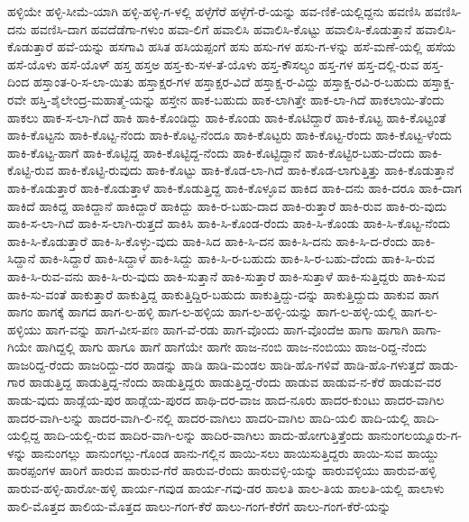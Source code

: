 ಹಳ್ಳಿಯೇ
ಹಳ್ಳಿ-ಸೀಮೆ-ಯಾಗಿ
ಹಳ್ಳಿ-ಹಳ್ಳಿ-ಗ-ಳಲ್ಲಿ
ಹಳ್ಳೆಗೆರೆ
ಹಳ್ಳೆಗೆ-ರೆ-ಯನ್ನು
ಹವ-ಣಿಕೆ-ಯಲ್ಲಿದ್ದನು
ಹವಣಿಸಿ
ಹವಣಿಸಿ-ದನು
ಹವಣಿಸಿ-ದಾಗ
ಹವದೆಡೆಗಾ-ಗಳುಂ
ಹವಾ-ಲಿಗೆ
ಹವಾಲಿಸಿ
ಹವಾಲಿಸಿ-ಕೊಟ್ಟು
ಹವಾಲಿಸಿ-ಕೊಡುತ್ತಾನೆ
ಹವಾಲಿಸಿ-ಕೊಡುತ್ತಾರೆ
ಹವೆ-ಯನ್ನು
ಹಸಗಾವಿ
ಹಸಿತ
ಹಸಿಯಪ್ಪಂಗೆ
ಹಸು
ಹಸು-ಗಳ
ಹಸು-ಗ-ಳನ್ನು
ಹಸೆ-ಮಣೆ-ಯಲ್ಲಿ
ಹಸೆಯ
ಹಸೆ-ಯೊಳು
ಹಸೆ-ಯೊಳ್
ಹಸ್ತ
ಹಸ್ತಅ
ಹಸ್ತ-ಕು-ಸಳ-ತೆ-ಯೊಳು
ಹಸ್ತ-ಕೌಸಲ್ಯಂ
ಹಸ್ತ-ಗಳ
ಹಸ್ತ-ದಲ್ಲಿ-ರುವ
ಹಸ್ತ-ದಿಂದ
ಹಸ್ತಾಂತ-ರಿ-ಸ-ಲಾ-ಯಿತು
ಹಸ್ತಾಕ್ಷರ-ಗಳ
ಹಸ್ತಾಕ್ಷರ-ವಿದೆ
ಹಸ್ತಾಕ್ಷ-ರ-ವಿದ್ದು
ಹಸ್ತಾಕ್ಷ-ರವಿ-ರ-ಬಹುದು
ಹಸ್ತಾಕ್ಷ-ರವೇ
ಹಸ್ತಿ-ಶೈಲೇಂದ್ರ-ಮಹಾತ್ಮೆ-ಯನ್ನು
ಹಸ್ತೇನ
ಹಾಕ-ಬಹುದು
ಹಾಕ-ಲಾಗಿತ್ತೇ
ಹಾಕ-ಲಾ-ಗಿದೆ
ಹಾಕಲಾಯಿ-ತೆಂದು
ಹಾಕಲು
ಹಾಕ-ಸ-ಲಾ-ಗಿದೆ
ಹಾಕಿ
ಹಾಕಿ-ಕೊಂಡಿದ್ದು
ಹಾಕಿ-ಕೊಂಡು
ಹಾಕಿ-ಕೊಟಿದ್ದಾರೆ
ಹಾಕಿ-ಕೊಟ್ಟ
ಹಾಕಿ-ಕೊಟ್ಟಂತೆ
ಹಾಕಿ-ಕೊಟ್ಟನು
ಹಾಕಿ-ಕೊಟ್ಟ-ನೆಂದು
ಹಾಕಿ-ಕೊಟ್ಟ-ನೆಂದೂ
ಹಾಕಿ-ಕೊಟ್ಟರು
ಹಾಕಿ-ಕೊಟ್ಟ-ರೆಂದು
ಹಾಕಿ-ಕೊಟ್ಟ-ಳೆಂದು
ಹಾಕಿ-ಕೊಟ್ಟ-ಹಾಗೆ
ಹಾಕಿ-ಕೊಟ್ಟಿದ್ದ
ಹಾಕಿ-ಕೊಟ್ಟಿದ್ದ-ನೆಂದು
ಹಾಕಿ-ಕೊಟ್ಟಿದ್ದಾನೆ
ಹಾಕಿ-ಕೊಟ್ಟಿರ-ಬಹು-ದೆಂದು
ಹಾಕಿ-ಕೊಟ್ಟಿ-ರುವ
ಹಾಕಿ-ಕೊಟ್ಟಿ-ರುವುದು
ಹಾಕಿ-ಕೊಟ್ಟು
ಹಾಕಿ-ಕೊಡ-ಲಾ-ಗಿದೆ
ಹಾಕಿ-ಕೊಡ-ಲಾಗುತ್ತಿತ್ತು
ಹಾಕಿ-ಕೊಡುತ್ತಾನೆ
ಹಾಕಿ-ಕೊಡುತ್ತಾರೆ
ಹಾಕಿ-ಕೊಡುತ್ತಾಳೆ
ಹಾಕಿ-ಕೊಡುತ್ತಿದ್ದ
ಹಾಕಿ-ಕೊಳ್ಳೂವ
ಹಾಕಿದ
ಹಾಕಿ-ದನು
ಹಾಕಿ-ದರೂ
ಹಾಕಿ-ದಾಗ
ಹಾಕಿದೆ
ಹಾಕಿದ್ದ
ಹಾಕಿದ್ದಾನೆ
ಹಾಕಿದ್ದಾರೆ
ಹಾಕಿದ್ದು
ಹಾಕಿ-ರ-ಬಹು-ದಾದ
ಹಾಕಿ-ರುತ್ತಾರೆ
ಹಾಕಿ-ರುವ
ಹಾಕಿ-ರು-ವುದು
ಹಾಕಿ-ಸ-ಲಾ-ಗಿದೆ
ಹಾಕಿ-ಸ-ಲಾಗಿ-ರುತ್ತದೆ
ಹಾಕಿಸಿ
ಹಾಕಿ-ಸಿ-ಕೊಂಡ-ರೆಂದು
ಹಾಕಿ-ಸಿ-ಕೊಂಡು
ಹಾಕಿ-ಸಿ-ಕೊಟ್ಟ-ನೆಂದು
ಹಾಕಿ-ಸಿ-ಕೊಡುತ್ತಾರೆ
ಹಾಕಿ-ಸಿ-ಕೊಳ್ಳು-ವುದು
ಹಾಕಿ-ಸಿದ
ಹಾಕಿ-ಸಿ-ದನ
ಹಾಕಿ-ಸಿ-ದನು
ಹಾಕಿ-ಸಿ-ದ-ರೆಂದು
ಹಾಕಿ-ಸಿದ್ದಾನೆ
ಹಾಕಿ-ಸಿದ್ದಾರೆ
ಹಾಕಿ-ಸಿದ್ದಾಳೆ
ಹಾಕಿ-ಸಿದ್ದು
ಹಾಕಿ-ಸಿ-ರ-ಬಹುದು
ಹಾಕಿ-ಸಿ-ರ-ಬಹು-ದೆಂದು
ಹಾಕಿ-ಸಿ-ರುವ
ಹಾಕಿ-ಸಿ-ರುವ-ವನು
ಹಾಕಿ-ಸಿ-ರು-ವುದು
ಹಾಕಿ-ಸುತ್ತಾನೆ
ಹಾಕಿ-ಸುತ್ತಾರೆ
ಹಾಕಿ-ಸುತ್ತಾಳೆ
ಹಾಕಿ-ಸುತ್ತಿದ್ದರು
ಹಾಕಿ-ಸುವ
ಹಾಕಿ-ಸು-ವಂತೆ
ಹಾಕುತ್ತಾರೆ
ಹಾಕುತ್ತಿದ್ದ
ಹಾಕುತ್ತಿದ್ದಿರ-ಬಹುದು
ಹಾಕುತ್ತಿದ್ದು-ದನ್ನು
ಹಾಕುತ್ತಿದ್ದುದು
ಹಾಕುವ
ಹಾಗ
ಹಾಗಂ
ಹಾಗಕ್ಕೆ
ಹಾಗದ
ಹಾಗ-ಲ-ಹಳ್ಳಿ
ಹಾಗ-ಲ-ಹಳ್ಳಿಯ
ಹಾಗ-ಲ-ಹಳ್ಳಿ-ಯನ್ನು
ಹಾಗ-ಲ-ಹಳ್ಳಿ-ಯಲ್ಲಿ
ಹಾಗ-ಲ-ಹಳ್ಳಿಯು
ಹಾಗ-ವನ್ನು
ಹಾಗ-ವೀಸ-ಪಣ
ಹಾಗ-ವೆ-ರಡು
ಹಾಗ-ವೊಂದು
ಹಾಗ-ವೊಂದೆಱ
ಹಾಗಾ
ಹಾಗಾಗಿ
ಹಾಗಾ-ಗಿಯೇ
ಹಾಗಿದ್ದಲ್ಲಿ
ಹಾಗು
ಹಾಗೂ
ಹಾಗೆ
ಹಾಗೆಯೇ
ಹಾಗೇ
ಹಾಜ-ನಂಬಿ
ಹಾಜ-ನಂಬಿಯು
ಹಾಜ-ರಿದ್ದ-ನೆಂದು
ಹಾಜರಿದ್ದ-ರೆಂದು
ಹಾಜರಿದ್ದು-ದರ
ಹಾಡನ್ನು
ಹಾಡಿ
ಹಾಡಿ-ಮಂಡಲ
ಹಾಡಿ-ಹೊ-ಗಳಿವೆ
ಹಾಡಿ-ಹೊ-ಗಳುತ್ತದೆ
ಹಾಡು-ಗಾರ
ಹಾಡುತ್ತಿದ್ದ
ಹಾಡುತ್ತಿದ್ದ-ನೆಂದು
ಹಾಡುತ್ತಿದ್ದರು
ಹಾಡುತ್ತಿದ್ದ-ರೆಂದು
ಹಾಡುವ
ಹಾಡುವ-ನ-ಕೆರೆ
ಹಾಡುವ-ವರ
ಹಾಡು-ವುದು
ಹಾಡ್ಲೆಯ-ಪುರ
ಹಾಡ್ಲೆಯ-ಪುರದ
ಹಾಥಿ-ದರ-ವಾಜ
ಹಾದ-ನೂರು
ಹಾದರ-ಕುಂಟು
ಹಾದರ-ವಾಗಿಲ
ಹಾದರ-ವಾಗಿ-ಲನ್ನು
ಹಾದರ-ವಾಗಿ-ಲಿ-ನಲ್ಲಿ
ಹಾದರ-ವಾಗಿಲು
ಹಾದರಿ-ವಾಗಿಲ
ಹಾದಿ-ಯಲಿ
ಹಾದಿ-ಯಲ್ಲಿ
ಹಾದಿ-ಯಲ್ಲಿದ್ದ
ಹಾದಿ-ಯಲ್ಲಿ-ರುವ
ಹಾದಿರ-ವಾಗಿ-ಲನ್ನು
ಹಾದಿರ-ವಾಗಿಲು
ಹಾದು-ಹೋಗುತ್ತಿತ್ತೆಂದು
ಹಾನುಂಗಲಯ್ನೂರು-ಗ-ಳನ್ನು
ಹಾನುಂಗಲ್ಲು
ಹಾನುಂಗಲ್ಲು-ಗೊಂಡ
ಹಾನು-ಗಲ್ಲಿನ
ಹಾಯಿ-ಸಲು
ಹಾಯಿಸುತ್ತಿದ್ದರು
ಹಾಯಿ-ಸುವ
ಹಾಯ್ದು
ಹಾರಪ್ಪಂಗಳ
ಹಾರಿಗೆ
ಹಾರುವ
ಹಾರುವ-ಗೆರೆ
ಹಾರುವ-ರೆಂದು
ಹಾರುವಳ್ಳಿ-ಯನ್ನು
ಹಾರುವಳ್ಳಿಯು
ಹಾರುವ-ಹಳ್ಳಿ
ಹಾರುವ-ಹಳ್ಳಿ-ಹಾರೋ-ಹಳ್ಳಿ
ಹಾರ್ಯ-ಗವುಡ
ಹಾರ್ಯ-ಗವು-ಡರ
ಹಾಲತಿ
ಹಾಲ-ತಿಯ
ಹಾಲತಿ-ಯಲ್ಲಿ
ಹಾಲಾಳು
ಹಾಲಿ-ಮೊತ್ತದ
ಹಾಲಿಯ-ಮೊತ್ತದ
ಹಾಲು-ಗಂಗ-ಕೆರೆ
ಹಾಲು-ಗಂಗ-ಕೆರೆಗೆ
ಹಾಲು-ಗಂಗ-ಕೆರೆ-ಯನ್ನು
